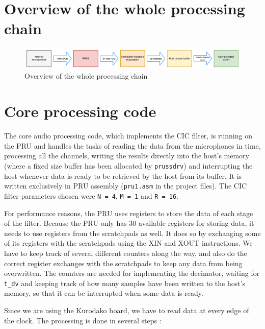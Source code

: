 \documentclass[]{report}
\begin{document}

\hypertarget{overview-of-the-whole-processing-chain}{%
\section{Overview of the whole processing
chain}\label{overview-of-the-whole-processing-chain}}

\begin{figure}[h]
\centering
\includegraphics[width=1.0\linewidth]{Pictures/PRU_processing_chain.png}
\caption{Overview of the whole processing chain}
\end{figure}

\hypertarget{core-processing-code}{%
\section{Core processing code}\label{core-processing-code}}

The core audio processing code, which implements the CIC filter, is running on the PRU and handles the tasks of reading the data from the microphones in time, processing all the channels, writing the results directly into the host's memory (where a fixed size buffer has been allocated by \texttt{prussdrv}) and interrupting the host whenever data is ready to be retrieved by the host from its buffer. It is written exclusively in PRU assembly (\texttt{pru1.asm} in the project files). The CIC filter parameters chosen were \texttt{N~=~4}, \texttt{M = 1} and \texttt{R = 16}.

For performance reasons, the PRU uses registers to store the data of each stage of the filter. Because the PRU only has 30 available registers for storing data, it needs to use registers from the scratchpads as well. It does so by exchanging some of its registers with the scratchpads using the XIN and XOUT instructions. We have to keep track of several different counters along the way, and also do the correct register exchanges with the scratchpads to keep any data from being overwritten. The counters are needed for implementing the decimator, waiting for \texttt{t\_dv} and keeping track of how many samples have been written to the host's memory, so that it can be interrupted when some data is ready.

Since we are using the Kurodako board, we have to read data at every edge
of the clock. The processing is done in several steps :
\end{document}
